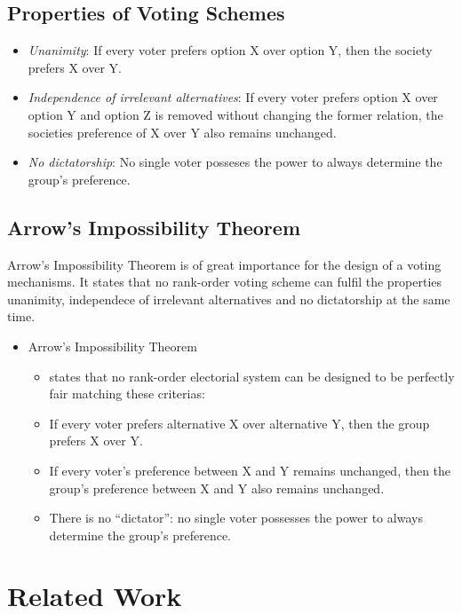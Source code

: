 \documentclass[conference]{IEEEtran}
\begin{document}
\subsection{Properties of Voting Schemes}
\begin{itemize}
    \item \textit{Unanimity}: If every voter prefers option X over option Y, then the society prefers X over Y.
    \item \textit{Independence of irrelevant alternatives}: If every voter prefers option X over option Y and option Z is removed without changing the former relation, the societies preference of X over Y also remains unchanged.
    \item \textit{No dictatorship}: No single voter posseses the power to always determine the group's preference.
\end{itemize}

\subsection{Arrow's Impossibility Theorem}
Arrow's Impossibility Theorem is of great importance for the design of a voting mechanisms. It states that no rank-order voting scheme can fulfil the properties unanimity, independece of irrelevant alternatives and no dictatorship at the same time.

\begin{itemize}
    \item Arrow's Impossibility Theorem
    \begin{itemize}
        \item states that no rank-order electorial system can be designed to be perfectly fair matching these criterias:
        \item If every voter prefers alternative X over alternative Y, then the group prefers X over Y.
        \item If every voter’s preference between X and Y remains unchanged, then the group’s preference between X and Y also remains unchanged.
        \item There is no “dictator”: no single voter possesses the power to always determine the group’s preference.
    \end{itemize}
\end{itemize}

\section{Related Work}\label{3RelatedWork}





\vspace{12pt}
\end{document}

